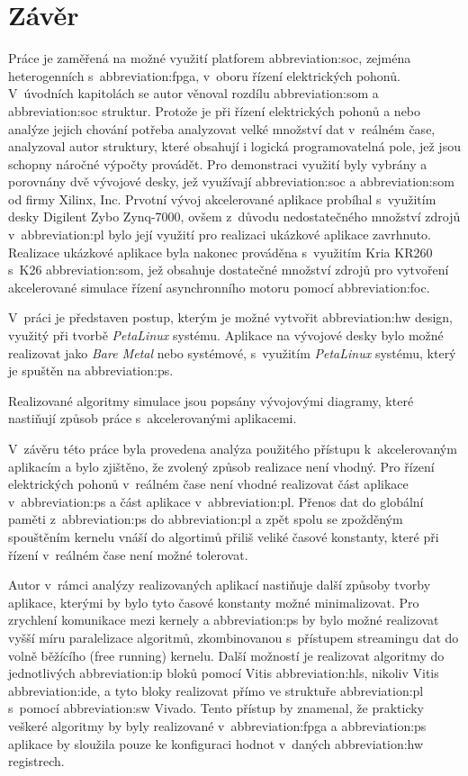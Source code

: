 \documentclass[a4paper, twoside, 11pt]{article}
\begin{document}
\section*{Závěr}
Práce je zaměřená na možné využití platforem \gls{abbreviation:soc}, zejména heterogenních s~\gls{abbreviation:fpga}, v~oboru řízení elektrických pohonů. V~úvodních kapitolách se autor věnoval rozdílu \gls{abbreviation:som} a \gls{abbreviation:soc} struktur. Protože je při řízení elektrických pohonů a nebo analýze jejich chování potřeba analyzovat velké množství dat v~reálném čase, analyzoval autor struktury, které obsahují i logická programovatelná pole, jež jsou schopny náročné výpočty provádět. Pro demonstraci využití byly vybrány a porovnány dvě vývojové desky, jež využívají \gls{abbreviation:soc} a \gls{abbreviation:som} od firmy Xilinx, Inc. Prvotní vývoj akcelerované aplikace probíhal s~využitím desky Digilent Zybo Zynq-7000, ovšem z~důvodu nedostatečného množství zdrojů v~\gls{abbreviation:pl} bylo její využití pro realizaci ukázkové aplikace zavrhnuto. Realizace ukázkové aplikace byla nakonec prováděna s~využitím Kria KR260 s~K26 \gls{abbreviation:som}, jež obsahuje dostatečné množství zdrojů pro vytvoření akcelerované simulace řízení asynchronního motoru pomocí \gls{abbreviation:foc}.\par
V~práci je představen postup, kterým je možné vytvořit \gls{abbreviation:hw} design, využitý při tvorbě \textit{PetaLinux} systému. Aplikace na vývojové desky bylo možné realizovat jako \textit{Bare Metal} nebo systémové, s~využitím \textit{PetaLinux} systému, který je spuštěn na \gls{abbreviation:ps}.\par
Realizované algoritmy simulace jsou popsány vývojovými diagramy, které nastiňují způsob práce s~akcelerovanými aplikacemi.\par
V~závěru této práce byla provedena analýza použitého přístupu k~akcelerovaným aplikacím a bylo zjištěno, že zvolený způsob realizace není vhodný. Pro řízení elektrických pohonů v~reálném čase není vhodné realizovat část aplikace v~\gls{abbreviation:ps} a část aplikace v~\gls{abbreviation:pl}. Přenos dat do globální paměti z~\gls{abbreviation:ps} do \gls{abbreviation:pl} a zpět spolu se zpožděným spouštěním kernelu vnáší do algortimů přiliš veliké časové konstanty, které při řízení v~reálném čase není možné tolerovat.\par
Autor v~rámci analýzy realizovaných aplikací nastiňuje další způsoby tvorby aplikace, kterými by bylo tyto časové konstanty možné minimalizovat. Pro zrychlení komunikace mezi kernely a \gls{abbreviation:ps} by bylo možné realizovat vyšší míru paralelizace algoritmů, zkombinovanou s~přístupem streamingu dat do volně běžícího (free running) kernelu. Další možností je realizovat algoritmy do jednotlivých \gls{abbreviation:ip} bloků pomocí Vitis \gls{abbreviation:hls}, nikoliv Vitis \gls{abbreviation:ide}, a tyto bloky realizovat přímo ve struktuře \gls{abbreviation:pl} s~pomocí \gls{abbreviation:sw} Vivado. Tento přístup by znamenal, že prakticky veškeré algoritmy by byly realizované v~\gls{abbreviation:fpga} a \gls{abbreviation:ps} aplikace by sloužila pouze ke konfiguraci hodnot v~daných \gls{abbreviation:hw} registrech.\par
\end{document}
